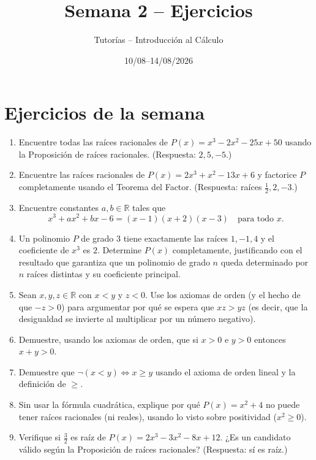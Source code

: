 \documentclass[11pt]{article}
\title{Semana 2 -- Ejercicios}
\author{Tutorías -- Introducción al Cálculo}
\date{10/08--14/08/2026}
\begin{document}
\maketitle

\section{Ejercicios de la semana}

\begin{enumerate}[label=\arabic*.]

\item Encuentre todas las raíces racionales de $P(x) = x^3 - 2x^2 - 25x + 50$
usando la Proposición de raíces racionales. (Respuesta: $2, 5, -5$.)

\item Encuentre las raíces racionales de $P(x) = 2x^3 + x^2 - 13x + 6$ y
factorice $P$ completamente usando el Teorema del Factor. (Respuesta:
raíces $\tfrac12, 2, -3$.)

\item Encuentre constantes $a,b \in \mathbb{R}$ tales que
$$x^3 + ax^2 + bx - 6 = (x-1)(x+2)(x-3) \quad \text{para todo } x.$$

\item Un polinomio $P$ de grado $3$ tiene exactamente las raíces $1, -1, 4$
y el coeficiente de $x^3$ es $2$. Determine $P(x)$ completamente,
justificando con el resultado que garantiza que un polinomio de grado $n$
queda determinado por $n$ raíces distintas y su coeficiente principal.

\item Sean $x,y,z \in \mathbb{R}$ con $x<y$ y $z<0$. Use los axiomas de orden
(y el hecho de que $-z>0$) para argumentar por qué se espera que
$xz > yz$ (es decir, que la desigualdad se invierte al multiplicar por un
número negativo).

\item Demuestre, usando los axiomas de orden, que si $x>0$ e $y>0$ entonces
$x+y>0$.

\item Demuestre que $\neg(x<y) \iff x\geq y$ usando el axioma de orden lineal
y la definición de $\geq$.

\item Sin usar la fórmula cuadrática, explique por qué $P(x)=x^2+4$ no puede
tener raíces racionales (ni reales), usando lo visto sobre positividad
($x^2\geq 0$).

\item Verifique si $\tfrac{3}{2}$ es raíz de $P(x) = 2x^3 - 3x^2 - 8x + 12$.
¿Es un candidato válido según la Proposición de raíces racionales?
(Respuesta: sí es raíz.)


\end{enumerate}
\end{document}
